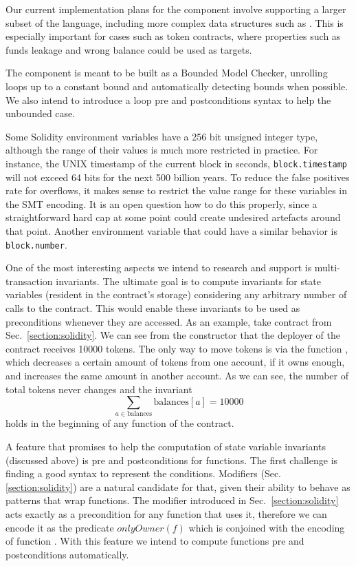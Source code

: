 Our current implementation plans for the component involve supporting
a larger subset of the language, including more complex data structures
such as .
%
This is especially important for cases such as token contracts, where
properties such as funds leakage and wrong balance could be used as targets.

The component is meant to be built as a Bounded Model Checker, unrolling loops
up to a constant bound and automatically detecting bounds when possible.
%
We also intend to introduce a loop pre and postconditions syntax to help the
unbounded case.

Some Solidity environment variables have a 256 bit unsigned integer type,
although the range of their values is much more restricted in practice.
For instance, the UNIX timestamp of the current block in seconds,
\texttt{block.timestamp} will not exceed 64 bits for the next
500 billion years. To reduce the false positives rate for
overflows, it makes sense to restrict the value range for these
variables in the SMT encoding. It is an open question how to do
this properly, since a straightforward hard cap at some point
could create undesired artefacts around that point.
Another environment variable that could have a similar
behavior is \texttt{block.number}.

One of the most interesting aspects we intend to research and support is
multi-transaction invariants.
%
The ultimate goal is to compute invariants for state variables (resident in the
contract's storage) considering any arbitrary number of calls to the contract.
%
This would enable these invariants to be used as preconditions whenever they
are accessed.
%
As an example, take contract  from Sec.~\ref{section:solidity}.
%
We can see from the constructor that the deployer of the contract receives
10000 tokens.
%
The only way to move tokens is via the function , which decreases a
certain amount of tokens from one account, if it owns enough, and increases the
same amount in another account.
%
As we can see, the number of total tokens never changes and the invariant
$$\sum_{a \in \mathrm{balances}} \mathrm{balances}[a] = 10000$$ holds in the beginning of any
function of the contract.

A feature that promises to help the computation of state variable invariants
(discussed above) is pre and postconditions for functions.
%
The first challenge is finding a good syntax to represent the conditions.
%
Modifiers (Sec.\ref{section:solidity}) are a natural candidate for that, given
their ability to behave as patterns that wrap functions.
%
The modifier  introduced in Sec.~\ref{section:solidity} acts
exactly as a precondition for any function that uses it, therefore we can
encode it as the predicate $onlyOwner(f)$ which is conjoined with the encoding
of function .
%
With this feature we intend to compute functions pre and postconditions
automatically.

